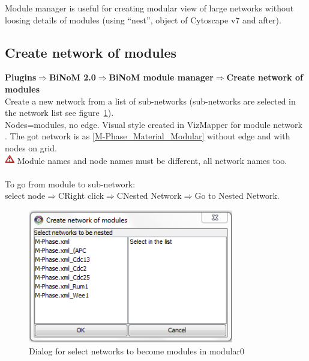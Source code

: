 Module manager is useful for creating modular view of large networks without loosing details of modules (using “nest”, object of Cytoscape v7 and after).

\subsection{Create network of modules}
\textbf{Plugins$\Rightarrow$BiNoM 2.0$\Rightarrow$BiNoM module manager$\Rightarrow$Create network of modules}\\
Create a new network from a list of sub-networks (sub-networks are selected in the network list see figure~\ref{Create_network_of_modules}).\\
Nodes=modules, no edge. Visual style created in VizMapper for module network . The got network is as \ref{M-Phase_Material_Modular} without edge and with nodes on grid.\\
\includegraphics[width=12pt,height=12pt]{graphics/warning} Module names and node names must be different, all network names too.\\\\
To go from module to sub-network:\\
select node$\Rightarrow$CRight click$\Rightarrow$CNested Network$\Rightarrow$Go to Nested Network.
\begin{figure}
\centering
\includegraphics[width=0.8\textwidth]{graphics/Create_network_of_modules}
\caption{Dialog for select networks to become modules in modular0}
\label{Create_network_of_modules}
\end{figure}

